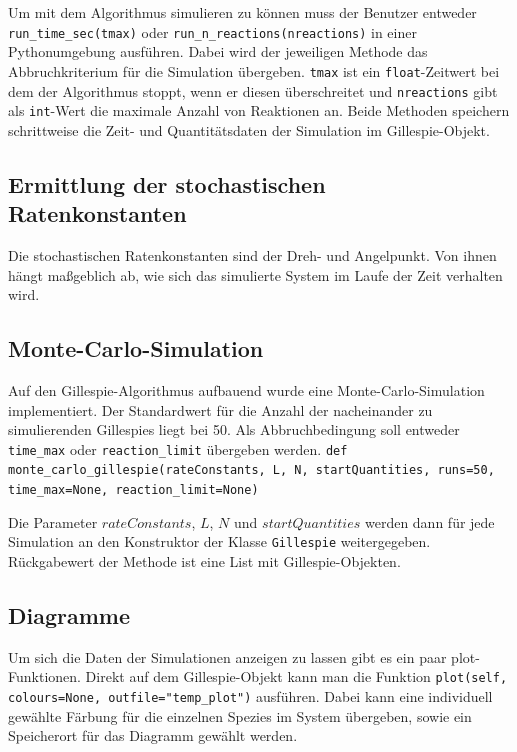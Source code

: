 Um mit dem Algorithmus simulieren zu können muss der Benutzer entweder\newline
\texttt{run\_time\_sec(tmax)} oder \texttt{run\_n\_reactions(nreactions)} in einer Pythonumgebung ausführen. Dabei wird der jeweiligen Methode das Abbruchkriterium für die Simulation übergeben. \texttt{tmax} ist ein \texttt{float}-Zeitwert bei dem der Algorithmus stoppt, wenn er diesen überschreitet und \texttt{nreactions} gibt als \texttt{int}-Wert die maximale Anzahl von Reaktionen an. Beide Methoden speichern schrittweise die Zeit- und Quantitätsdaten der Simulation im Gillespie-Objekt.

\subsection{Ermittlung der stochastischen Ratenkonstanten}
Die stochastischen Ratenkonstanten sind der Dreh- und Angelpunkt. Von ihnen hängt maßgeblich ab, wie sich das simulierte System im Laufe der Zeit verhalten wird.

\subsection{Monte-Carlo-Simulation}
Auf den Gillespie-Algorithmus aufbauend wurde eine Monte-Carlo-Simulation implementiert. Der Standardwert für die Anzahl der nacheinander zu simulierenden Gillespies liegt bei 50. Als Abbruchbedingung soll entweder \texttt{time\_max} oder\newline
\texttt{reaction\_limit} übergeben werden.\newline
\texttt{def monte\_carlo\_gillespie(rateConstants, L, N, startQuantities,\newline
	runs=50, time\_max=None, reaction\_limit=None)}
	
Die Parameter $rateConstants$, $L$, $N$ und $startQuantities$ werden dann für jede Simulation an den Konstruktor der Klasse \texttt{Gillespie} weitergegeben. Rückgabewert der Methode ist eine List mit Gillespie-Objekten.

\subsection{Diagramme}
Um sich die Daten der Simulationen anzeigen zu lassen gibt es ein paar plot-Funktionen. Direkt auf dem Gillespie-Objekt kann man die Funktion \texttt{plot(self, colours=None, outfile="temp\_plot")} ausführen. Dabei kann eine individuell gewählte Färbung für die einzelnen Spezies im System übergeben, sowie ein Speicherort für das Diagramm gewählt werden.\par

